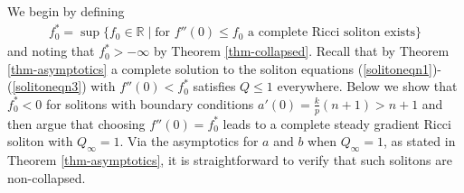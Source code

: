 \documentclass{amsart}
\theoremstyle{definition}
\theoremstyle{remark}
\numberwithin{equation}{section}
\begin{document}
We begin by defining 
\begin{align*}
f^{\ast}_0 = \sup \{ f_0 \in \mathbb{R}\; |\; \text{for } f''(0) \leq f_0 \text{ a complete Ricci soliton exists} \}
\end{align*}
and noting that $f^{\ast}_0 > -\infty$ by Theorem \ref{thm-collapsed}. Recall that by Theorem \ref{thm-asymptotics} a complete solution to the soliton equations (\ref{solitoneqn1})-(\ref{solitoneqn3}) with $f''(0) < f^{\ast}_0$ satisfies $Q \leq 1$ everywhere. Below we show that $f^{\ast}_0 < 0$ for solitons with boundary conditions $a'(0) = \frac{k}{p}(n+1) > n+1$ and then argue that choosing $f''(0) = f^{\ast}_0$ leads to a complete steady gradient Ricci soliton with $Q_\infty =1$. Via the asymptotics for $a$ and $b$ when $Q_\infty=1$, as stated in Theorem \ref{thm-asymptotics}, it is straightforward to verify that such solitons are non-collapsed. 
\end{document}

